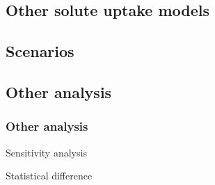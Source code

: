 \subsection{Other solute uptake models}
\begin{frame}
\end{frame}

\subsection{Scenarios}
\begin{frame}
\end{frame}

\subsection{Other analysis}
\begin{frame}
\frametitle{Other analysis}
Sensitivity analysis

Statistical difference
\end{frame}

